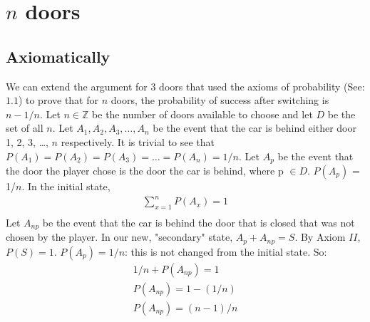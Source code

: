 \documentclass{article}
\begin{document}
\section{$n$ doors}

\subsection{Axiomatically}
We can extend the argument for 3 doors that used the axioms of probability (See: \textsection $1.1$) to prove that for $n$ doors, the probability of success after switching is $n-1/n$. Let $n \in \mathbb{Z}$ be the number of doors available to choose and let $D$ be the set of all $n$. Let $A_{1}, A_{2}, A_{3}, \ldots, A_{n}$ be the event that the car is behind either door 1, 2, 3, \ldots, $n$ respectively. It is trivial to see that $P(A_{1}) = P(A_{2}) = P(A_{3}) = \ldots = P(A_{n}) = 1/n$. Let $A_{p}$ be the event that the door the player chose is the door the car is behind, where p $\in D$. $P(A_{p})$ = 1/$n$. In the initial state, 
\begin{align*}
	\sum_{x=1}^{n} P(A_{x}) = 1 \\
\end{align*}
Let $A_{np}$ be the event that the car is behind the door that is closed that was not chosen by the player. In our new, "secondary" state, $A_{p} + A_{np} = S$. By Axiom $II$, $P(S) = 1$. $P(A_{p}) = 1/n$: this is not changed from the initial state. So:
\begin{align*}
1/n + P(A_{np}) = 1 \\
P(A_{np}) = 1-(1/n) \\
P(A_{np}) = (n-1)/n \\
\end{align*}
\end{document}
